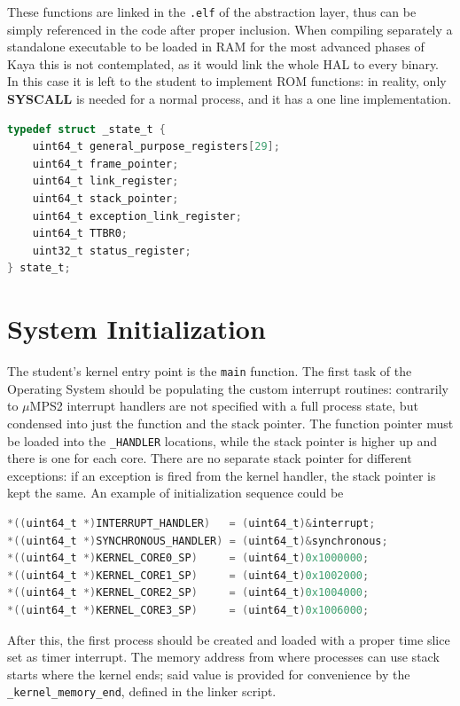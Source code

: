 \documentclass[12pt,a4paper,openright,twoside]{report}
\begin{document}
These functions are linked in the {\tt .elf} of the abstraction layer, thus can
be simply referenced in the code after proper inclusion. When compiling separately a
standalone executable to be loaded in RAM for the most advanced phases of Kaya
this is not contemplated, as it would link the whole HAL to every binary.
In this case it is left to the student to implement ROM functions: in reality, only
\textbf{SYSCALL} is needed for a normal process, and it has a one line implementation.
\newpage
\begin{lstlisting}[label={lst:state},caption={Process state format},language=C]
typedef struct _state_t {
    uint64_t general_purpose_registers[29];
    uint64_t frame_pointer;
    uint64_t link_register;
    uint64_t stack_pointer;
    uint64_t exception_link_register;
    uint64_t TTBR0;
    uint32_t status_register;
} state_t;
\end{lstlisting}

\section{System Initialization}
The student's kernel entry point is the {\tt main} function. The first task of 
the Operating System should be populating the custom interrupt routines: contrarily 
to $\mu$MPS2 interrupt handlers are not specified with a full process state, but
condensed into just the function and the stack pointer. The function pointer must
be loaded into the {\tt \_HANDLER} locations, while the stack pointer is higher 
up and there is one for each core. There are no separate stack pointer for different
exceptions: if an exception is fired from the kernel handler, the stack pointer
is kept the same.
An example of initialization sequence could be
\begin{lstlisting}[language=C]
*((uint64_t *)INTERRUPT_HANDLER)   = (uint64_t)&interrupt;
*((uint64_t *)SYNCHRONOUS_HANDLER) = (uint64_t)&synchronous;
*((uint64_t *)KERNEL_CORE0_SP)     = (uint64_t)0x1000000;
*((uint64_t *)KERNEL_CORE1_SP)     = (uint64_t)0x1002000;
*((uint64_t *)KERNEL_CORE2_SP)     = (uint64_t)0x1004000;
*((uint64_t *)KERNEL_CORE3_SP)     = (uint64_t)0x1006000;
\end{lstlisting}

After this, the first process should be created and loaded with a proper time
slice set as timer interrupt. The memory address from where processes can use 
stack starts where the kernel ends; said value is provided for convenience by 
the {\tt \_kernel\_memory\_end}, defined in the linker script.
\end{document}
